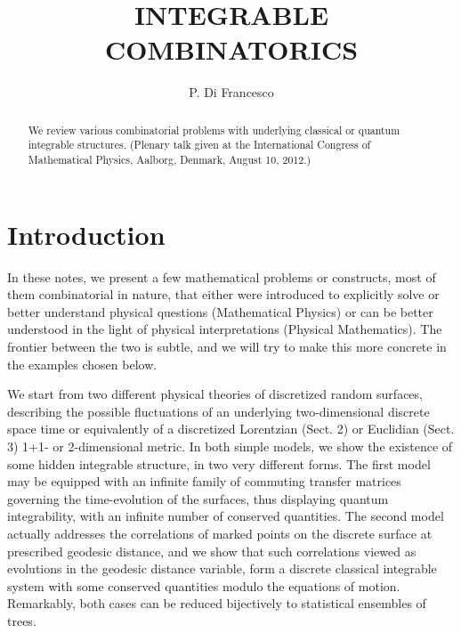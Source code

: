 \documentclass[12pt]{amsart}
\numberwithin{equation}{section}
\begin{document}
\title{INTEGRABLE COMBINATORICS}

\author{P. Di Francesco}

\address{Institut de Physique Th\'eorique, CEA Saclay IPHT,
Unit\'e de Recherche Associ\'ee du CNRS,
91191 Gif sur Yvette Cedex, France.
E-mail: philippe.di-francesco@cea.fr}

\begin{abstract}
We review various combinatorial problems with underlying classical or quantum integrable structures.
(Plenary talk given at the International Congress of Mathematical Physics, Aalborg, 
Denmark, August 10, 2012.)
\end{abstract}

\maketitle

\section{Introduction}

In these notes, we present a few mathematical problems or constructs, most of them combinatorial in nature, that
either were introduced to explicitly solve or better understand physical questions (Mathematical Physics)
or can be better understood in the light of physical interpretations (Physical Mathematics). The frontier
between the two is subtle, and we will try to make this more concrete in the examples chosen below.

We start from two different physical theories of discretized random surfaces, describing the possible fluctuations
of an underlying two-dimensional discrete space time or equivalently of a discretized 
Lorentzian\cite{AL} (Sect. 2) or Euclidian\cite{DISC} (Sect. 3) 1+1- or 2-dimensional metric. 
In both simple models, we show the existence
of some hidden integrable structure, in two very different forms. The first model may be equipped with an infinite
family of commuting transfer matrices\cite{LORGRA} governing the time-evolution of the surfaces, thus displaying quantum 
integrability, with an infinite number of conserved quantities. The second model actually addresses
the correlations of marked points on the discrete surface at prescribed geodesic distance, and we show that such correlations
viewed as evolutions in the geodesic distance variable,
form a discrete classical integrable system with some conserved quantities modulo the equations of motion\cite{GEOD}.
Remarkably, both cases can be reduced bijectively to statistical ensembles of trees.
\end{document}

